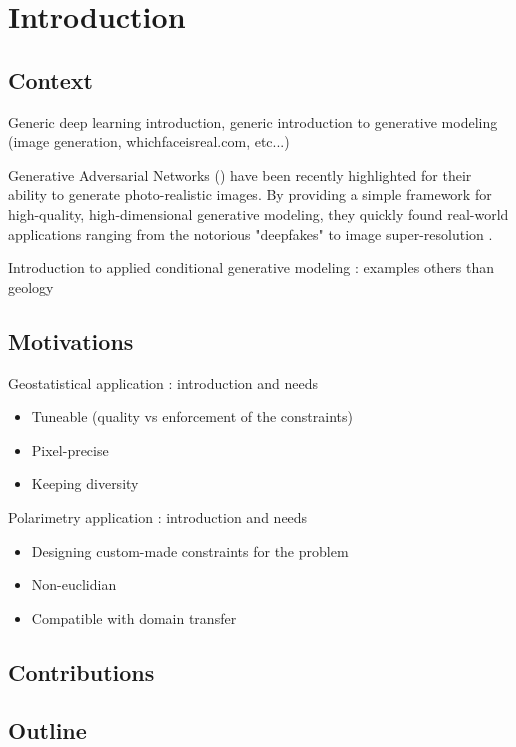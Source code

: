 \chapter*{Introduction}
\label{chap:intro}

\section*{Context}
Generic deep learning introduction, generic introduction to generative modeling (image generation, whichfaceisreal.com, etc...)

Generative Adversarial Networks (\GAN) \cite{Goodfellow2014} have been recently highlighted for their ability to generate photo-realistic images. By providing a simple framework for high-quality, high-dimensional generative modeling, they quickly found real-world applications ranging from the notorious "deepfakes" \cite{Vaccari2020} to image super-resolution \cite{Ledig2016}.

Introduction to applied conditional generative modeling : examples others than geology

\section*{Motivations}
Geostatistical application :  introduction and needs \begin{itemize}
	\item Tuneable (quality vs enforcement of the constraints)
	\item Pixel-precise
	\item Keeping diversity
\end{itemize}

Polarimetry application : introduction and needs \begin{itemize}
	\item Designing custom-made constraints for the problem
	\item Non-euclidian
	\item Compatible with domain transfer
\end{itemize}

\section*{Contributions}

\section*{Outline}
